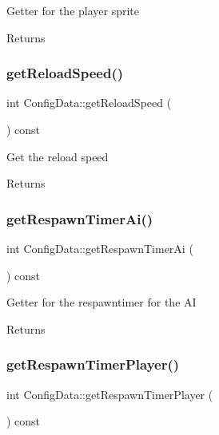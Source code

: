 Getter for the player sprite \begin{DoxyReturn}{Returns}

\end{DoxyReturn}
\mbox{\label{classConfigData_a3081c0e98b204b3f05fb06c98f7d216e}} 
\subsubsection{\texorpdfstring{get\+Reload\+Speed()}{getReloadSpeed()}}
{\footnotesize\ttfamily int Config\+Data\+::get\+Reload\+Speed (\begin{DoxyParamCaption}{ }\end{DoxyParamCaption}) const}

Get the reload speed \begin{DoxyReturn}{Returns}

\end{DoxyReturn}
\mbox{\label{classConfigData_a6ddf5ff9a004d3b236622e900a652922}} 
\subsubsection{\texorpdfstring{get\+Respawn\+Timer\+Ai()}{getRespawnTimerAi()}}
{\footnotesize\ttfamily int Config\+Data\+::get\+Respawn\+Timer\+Ai (\begin{DoxyParamCaption}{ }\end{DoxyParamCaption}) const}

Getter for the respawntimer for the AI \begin{DoxyReturn}{Returns}

\end{DoxyReturn}
\mbox{\label{classConfigData_a115ef1483345c4b89e9984f370dabbcc}} 
\subsubsection{\texorpdfstring{get\+Respawn\+Timer\+Player()}{getRespawnTimerPlayer()}}
{\footnotesize\ttfamily int Config\+Data\+::get\+Respawn\+Timer\+Player (\begin{DoxyParamCaption}{ }\end{DoxyParamCaption}) const}


